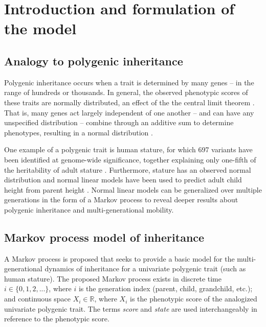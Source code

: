 \documentclass[a4paper,11pt]{article} %
\begin{document}
\let\thefootnote\relax{}


\newpage

\tableofcontents
\clearpage





\section{Introduction and formulation of the model}

\subsection{Analogy to polygenic inheritance}
Polygenic inheritance occurs when a trait is determined by many genes -- in the range of hundreds or thousands. In general, the observed phenotypic scores of these traits are normally distributed, an effect of the the central limit theorem \cite{rieger, lange_article}. That is, many genes act largely independent of one another -- and can have any unspecified distribution -- combine through an additive sum to determine phenotypes, resulting in a normal distribution \cite{lange_book}. 

One example of a polygenic trait is human stature, for which 697 variants have been identified at genome-wide significance, together explaining only one-fifth of the heritability of adult stature \cite{preece, wood}. Furthermore, stature has an observed normal distribution and normal linear models have been used to predict adult child height from parent height \cite{luo}. Normal linear models can be generalized over multiple generations in the form of a Markov process to reveal deeper results about polygenic inheritance and multi-generational mobility. 

\subsection{Markov process model of inheritance}


A Markov process is proposed that seeks to provide a basic model for the multi-generational dynamics of inheritance for a univariate polygenic trait (such as human stature). The proposed Markov process exists in discrete time $ i \in \{0, 1, 2,...\}$, where $i$ is the generation index (parent, child, grandchild, etc.); and continuous space $X_i \in \mathbb{R}$, where $X_i$ is the phenotypic score of the analogized univariate polygenic trait. The terms \emph{score} and \emph{state} are used interchangeably in reference to the phenotypic score. 
\end{document}
